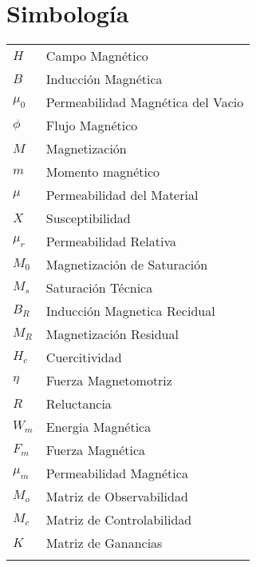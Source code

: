 \chapter{Simbolog\'ia}


\begin{tabular}{ll}
	$H$\hspace{3cm} & Campo Magn\'etico \\
	$B$\hspace{3cm} & Inducci\'on Magn\'etica\\
	$\mu_0$\hspace{3cm} & Permeabilidad Magn\'etica del Vacio \\
	$\phi$\hspace{3cm} & Flujo Magn\'etico\\
	$M$\hspace{3cm} & Magnetizaci\'on\\
	$m$\hspace{3cm} & Momento magn\'etico\\
	$\mu$\hspace{3cm} & Permeabilidad del Material\\ 
	$X$\hspace{3cm} & Susceptibilidad\\
	$\mu_r$\hspace{3cm} & Permeabilidad Relativa\\
	$M_0$\hspace{3cm} & Magnetizaci\'on de Saturaci\'on\\
	$M_s$\hspace{3cm} & Saturaci\'on T\'ecnica\\
	$B_R$\hspace{3cm} & Inducci\'on Magnetica Recidual\\
	$M_R$\hspace{3cm} & Magnetizaci\'on Residual\\
	$H_c$\hspace{3cm} & Cuercitividad\\
	$\eta$\hspace{3cm} & Fuerza Magnetomotriz\\
	$R$\hspace{3cm} & Reluctancia\\
	$W_m$\hspace{3cm} & Energia Magn\'etica\\
	$F_m$\hspace{3cm} & Fuerza Magn\'etica \\
	$\mu_m$\hspace{3cm} & Permeabilidad Magn\'etica\\	
	$M_o$\hspace{3cm} & Matriz de Observabilidad\\
	$M_c$\hspace{3cm} & Matriz de Controlabilidad\\
	$K$\hspace{3cm} & Matriz de Ganancias\\
	
	\\
\end{tabular}

